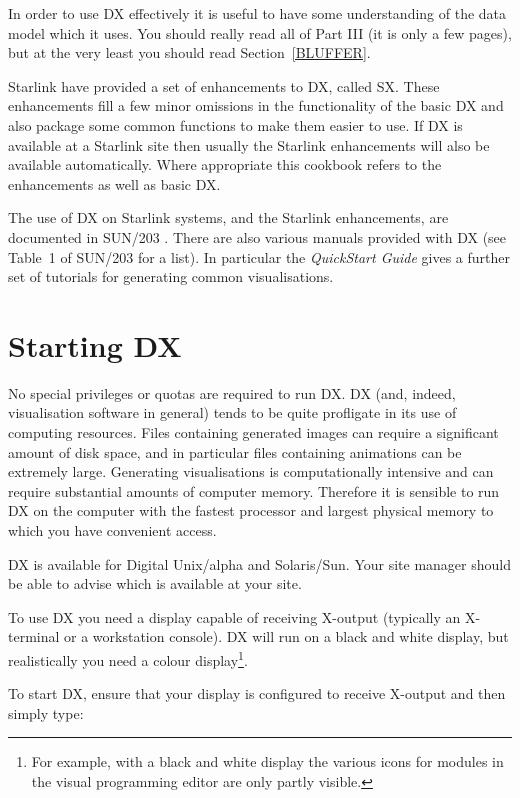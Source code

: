 In order to use DX effectively it is useful to have some
understanding of the data model which it uses. You should really read
all of Part III (it is only a few pages), but at the very least you
should read Section~\ref{BLUFFER}.

Starlink have provided a set of enhancements to DX, called SX. These
enhancements fill a few minor omissions in the functionality of the basic
DX and also package some common functions to make them easier to use. If
DX is available at a Starlink site then usually the Starlink enhancements
will also be available automatically. Where appropriate this cookbook
refers to the enhancements as well as basic DX.

The use of DX on Starlink systems, and the Starlink enhancements, are
documented in SUN/203 \cite{SUN203}. There are also various manuals
provided with DX (see  Table~1 of SUN/203 for a list). In particular the
{\it QuickStart Guide}\cite{QUICKS} gives a further set of tutorials for
generating common visualisations.


\section{\label{START}Starting DX}
No special privileges or quotas are required to run DX. DX (and, indeed,
visualisation software in general) tends to be quite profligate in its
use of computing resources. Files containing generated images can
require a significant amount of disk space, and in particular files
containing animations can be extremely large. Generating visualisations is 
computationally intensive and can require substantial amounts of computer
memory. Therefore it is sensible to run DX on the computer with the 
fastest processor and largest physical memory to which you have convenient
access.

DX is available for Digital Unix/alpha and Solaris/Sun.  Your site manager
should be able to advise which is available at your site.

To use DX you need a display capable of receiving X-output (typically an
X-terminal or a workstation console). DX will run on a black and white
display, but realistically you need a colour display\footnote{ For
example, with a black and white display the various icons for modules
in the visual programming editor are only partly visible.}.

To start DX, ensure that your display is configured to receive X-output
and then simply type:

